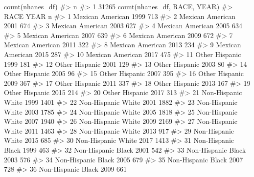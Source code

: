 \documentclass[
  letterpaper,
]{krantz}
\makeatletter
\newenvironment{Shaded}{\begin{snugshade}}{\end{snugshade}}
\newcommand{\CommentTok}[1]{\textcolor[rgb]{0.37,0.37,0.37}{#1}}
\newcommand{\FunctionTok}[1]{\textcolor[rgb]{0.28,0.35,0.67}{#1}}
\newcommand{\NormalTok}[1]{\textcolor[rgb]{0.00,0.23,0.31}{#1}}
\newenvironment{kframe}{%
\medskip{}
\setlength{\fboxsep}{.8em}
 \def\at@end@of@kframe{}%
 \ifinner\ifhmode%
  \def\at@end@of@kframe{\end{minipage}}%
  \begin{minipage}{\columnwidth}%
 \fi\fi%
 \def\FrameCommand##1{\hskip\@totalleftmargin \hskip-\fboxsep
 \colorbox{shadecolor}{##1}\hskip-\fboxsep
     \hskip-\linewidth \hskip-\@totalleftmargin \hskip\columnwidth}%
 \MakeFramed {\advance\hsize-\width
   \@totalleftmargin\z@ \linewidth\hsize
   \@setminipage}}%
 {\par\unskip\endMakeFramed%
 \at@end@of@kframe}
\renewenvironment{Shaded}{\begin{kframe}}{\end{kframe}}
\makeatother
\begin{document}
\begin{Shaded}
\begin{Highlighting}[]
\FunctionTok{count}\NormalTok{(nhanes\_df)}
\CommentTok{\#\textgreater{}       n}
\CommentTok{\#\textgreater{} 1 31265}
\FunctionTok{count}\NormalTok{(nhanes\_df, RACE, YEAR)}
\CommentTok{\#\textgreater{}                  RACE YEAR    n}
\CommentTok{\#\textgreater{} 1    Mexican American 1999  713}
\CommentTok{\#\textgreater{} 2    Mexican American 2001  674}
\CommentTok{\#\textgreater{} 3    Mexican American 2003  627}
\CommentTok{\#\textgreater{} 4    Mexican American 2005  634}
\CommentTok{\#\textgreater{} 5    Mexican American 2007  639}
\CommentTok{\#\textgreater{} 6    Mexican American 2009  672}
\CommentTok{\#\textgreater{} 7    Mexican American 2011  322}
\CommentTok{\#\textgreater{} 8    Mexican American 2013  234}
\CommentTok{\#\textgreater{} 9    Mexican American 2015  287}
\CommentTok{\#\textgreater{} 10   Mexican American 2017  475}
\CommentTok{\#\textgreater{} 11     Other Hispanic 1999  181}
\CommentTok{\#\textgreater{} 12     Other Hispanic 2001  129}
\CommentTok{\#\textgreater{} 13     Other Hispanic 2003   80}
\CommentTok{\#\textgreater{} 14     Other Hispanic 2005   96}
\CommentTok{\#\textgreater{} 15     Other Hispanic 2007  395}
\CommentTok{\#\textgreater{} 16     Other Hispanic 2009  367}
\CommentTok{\#\textgreater{} 17     Other Hispanic 2011  337}
\CommentTok{\#\textgreater{} 18     Other Hispanic 2013  167}
\CommentTok{\#\textgreater{} 19     Other Hispanic 2015  214}
\CommentTok{\#\textgreater{} 20     Other Hispanic 2017  313}
\CommentTok{\#\textgreater{} 21 Non{-}Hispanic White 1999 1401}
\CommentTok{\#\textgreater{} 22 Non{-}Hispanic White 2001 1882}
\CommentTok{\#\textgreater{} 23 Non{-}Hispanic White 2003 1785}
\CommentTok{\#\textgreater{} 24 Non{-}Hispanic White 2005 1818}
\CommentTok{\#\textgreater{} 25 Non{-}Hispanic White 2007 1940}
\CommentTok{\#\textgreater{} 26 Non{-}Hispanic White 2009 2169}
\CommentTok{\#\textgreater{} 27 Non{-}Hispanic White 2011 1463}
\CommentTok{\#\textgreater{} 28 Non{-}Hispanic White 2013  917}
\CommentTok{\#\textgreater{} 29 Non{-}Hispanic White 2015  685}
\CommentTok{\#\textgreater{} 30 Non{-}Hispanic White 2017 1413}
\CommentTok{\#\textgreater{} 31 Non{-}Hispanic Black 1999  463}
\CommentTok{\#\textgreater{} 32 Non{-}Hispanic Black 2001  542}
\CommentTok{\#\textgreater{} 33 Non{-}Hispanic Black 2003  576}
\CommentTok{\#\textgreater{} 34 Non{-}Hispanic Black 2005  679}
\CommentTok{\#\textgreater{} 35 Non{-}Hispanic Black 2007  728}
\CommentTok{\#\textgreater{} 36 Non{-}Hispanic Black 2009  661}

\end{Highlighting}
\end{Shaded}
\end{document}
